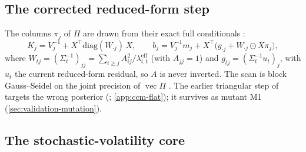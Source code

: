 \subsection{The corrected reduced-form step}\label{sec:samp-cccm}

The columns $\pi_j$ of $\Pi$ are drawn from their exact full conditionals \citep{carriero2022corrigendum}:
\begin{equation}\label{eq:cccm}
  K_j = V_j^{-1} + X^\top \mathrm{diag}(W_{\cdot j})\,X, \qquad
  b_j = V_j^{-1}m_j + X^\top\bigl(g_{\cdot j} + W_{\cdot j} \odot X\pi_j\bigr),
\end{equation}
where $W_{tj} = (\Sigma_t^{-1})_{jj} = \sum_{i \ge j} A_{ij}^2/\lambda^{\mathrm{eff}}_{i,t}$ (with
$A_{jj} = 1$) and $g_{tj} = (\Sigma_t^{-1}u_t)_j$, with $u_t$ the current reduced-form residual, so $A$
is never inverted.
The scan is block Gauss--Seidel on the joint precision of $\operatorname{vec}\Pi$
\citep{fox2017accelerated}. %
The earlier triangular step of \citet{carriero2019large} targets the wrong posterior
(\citealp{bognanni2022comment}; \cref{app:ccm-flat}); it survives as mutant M1
(\cref{sec:validation-mutation}). %

\subsection{The stochastic-volatility core}\label{sec:samp-sv}

